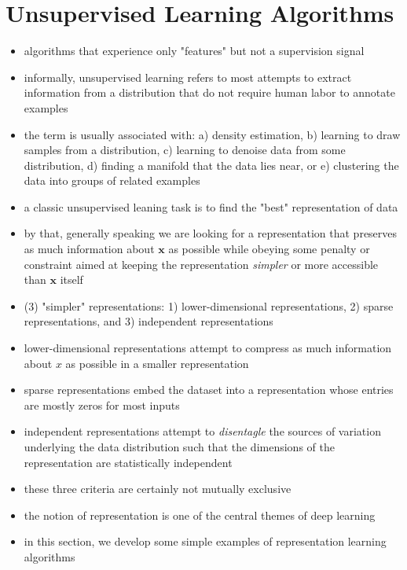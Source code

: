 \documentclass[11pt, twocolumn]{report}
\begin{document}
\section{Unsupervised Learning Algorithms}
\begin{itemize}
  \item algorithms that experience only "features" but not a supervision signal
  \item informally, unsupervised learning refers to most attempts to extract
    information from a distribution that do not require human labor to annotate
    examples
  \item the term is usually associated with: a) density estimation, b) learning
    to draw samples from a distribution, c) learning to denoise data from some
    distribution, d) finding a manifold that the data lies near, or e)
    clustering the data into groups of related examples
  \item a classic unsupervised leaning task is to find the "best"
    representation of data
  \item by that, generally speaking we are looking for a representation that
    preserves as much information about $\bm{x}$ as possible while obeying some
    penalty or constraint aimed at keeping the representation \textit{simpler}
    or more accessible than $\bm{x}$ itself
  \item (3) "simpler" representations: 1) lower-dimensional representations, 2)
    sparse representations, and 3) independent representations
  \item lower-dimensional representations attempt to compress as much
    information about $x$ as possible in a smaller representation
  \item sparse representations embed the dataset into a representation whose
    entries are mostly zeros for most inputs
  \item independent representations attempt to \textit{disentagle} the sources
    of variation underlying the data distribution such that the dimensions of
    the representation are statistically independent
  \item these three criteria are certainly not mutually exclusive
  \item the notion of representation is one of the central themes of deep
    learning
  \item in this section, we develop some simple examples of representation
    learning algorithms
\end{itemize}
\end{document}
